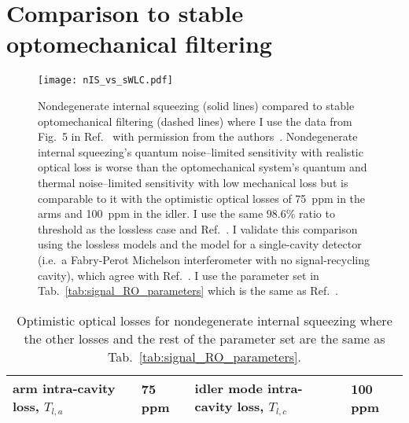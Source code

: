 
\section{Comparison to stable optomechanical filtering} %
\label{sec:nIS_vs_sWLC}

\begin{figure}
	\centering
	\texttt{[image: nIS\_vs\_sWLC.pdf]}
	\caption{Nondegenerate internal squeezing (solid lines) compared to stable optomechanical filtering (dashed lines) where I use the data from Fig.~5 in Ref.~\cite{liBroadbandSensitivityImprovement2020} with permission from the authors~\cite{xiangLiPersonalCommunication}. Nondegenerate internal squeezing's quantum noise--limited sensitivity with realistic optical loss is worse than the optomechanical system's quantum and thermal noise--limited sensitivity with low mechanical loss but is comparable to it with the optimistic optical losses of 75~ppm in the arms and 100~ppm in the idler. I use the same $98.6\%$ ratio to threshold as the lossless case and Ref.~\cite{liBroadbandSensitivityImprovement2020}. I validate this comparison using the lossless models and the model for a single-cavity detector (i.e.\ a Fabry-Perot Michelson interferometer with no signal-recycling cavity), which agree with Ref.~\cite{liBroadbandSensitivityImprovement2020}. I use the parameter set in Tab.~\ref{tab:signal_RO_parameters} which is the same as Ref.~\cite{liBroadbandSensitivityImprovement2020}.}
	\label{fig:nIS_vs_sWLC}
\end{figure}

\begin{table}
\centering
\begin{tabular}{@{}ll|ll@{}}
\toprule
arm intra-cavity loss, $T_{l,a}$ & 75 ppm & idler mode intra-cavity loss, $T_{l,c}$ & 100 ppm \\ \bottomrule
\end{tabular}
\caption{Optimistic optical losses for nondegenerate internal squeezing where the other losses and the rest of the parameter set are the same as Tab.~\ref{tab:signal_RO_parameters}.}
\label{tab:ideal_loss}
\end{table}

